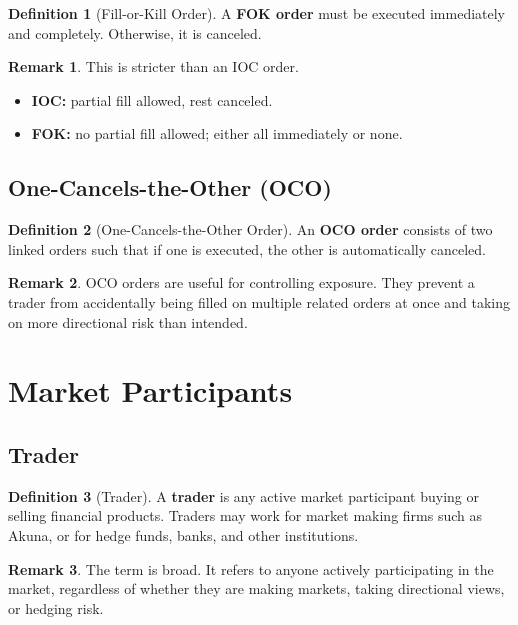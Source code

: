 \documentclass[11pt]{article}
\theoremstyle{definition}
\newtheorem{definition}{Definition}[section]
\newtheorem{remark}{Remark}[section]
\begin{document}
\begin{definition}[Fill-or-Kill Order]
A \textbf{FOK order} must be executed immediately and completely. Otherwise, it is canceled.
\end{definition}

\begin{remark}
This is stricter than an IOC order.
\begin{itemize}[leftmargin=2em]
    \item \textbf{IOC:} partial fill allowed, rest canceled.
    \item \textbf{FOK:} no partial fill allowed; either all immediately or none.
\end{itemize}
\end{remark}

\subsection{One-Cancels-the-Other (OCO)}

\begin{definition}[One-Cancels-the-Other Order]
An \textbf{OCO order} consists of two linked orders such that if one is executed, the other is automatically canceled.
\end{definition}

\begin{remark}
OCO orders are useful for controlling exposure. They prevent a trader from accidentally being filled on multiple related orders at once and taking on more directional risk than intended.
\end{remark}

\section{Market Participants}

\subsection{Trader}

\begin{definition}[Trader]
A \textbf{trader} is any active market participant buying or selling financial products. Traders may work for market making firms such as Akuna, or for hedge funds, banks, and other institutions.
\end{definition}

\begin{remark}
The term is broad. It refers to anyone actively participating in the market, regardless of whether they are making markets, taking directional views, or hedging risk.
\end{remark}
\end{document}
